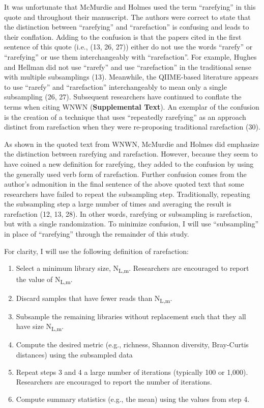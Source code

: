 \documentclass[
]{article}
\providecommand{\tightlist}{%
  \setlength{\itemsep}{0pt}\setlength{\parskip}{0pt}}
\begin{document}
It was unfortunate that McMurdie and Holmes used the term ``rarefying''
in this quote and throughout their manuscript. The authors were correct
to state that the distinction between ``rarefying'' and ``rarefaction''
is confusing and leads to their conflation. Adding to the confusion is
that the papers cited in the first sentence of this quote (i.e., (13,
26, 27)) either do not use the words ``rarefy'' or ``rarefying'' or use
them interchangeably with ``rarefaction''. For example, Hughes and
Hellman did not use ``rarefy'' and use ``rarefaction'' in the
traditional sense with multiple subsamplings (13). Meanwhile, the
QIIME-based literature appears to use ``rarefy'' and ``rarefaction''
interchangeably to mean only a single subsampling (26, 27). Subsequent
researchers have continued to conflate the terms when citing WNWN
(\textbf{Supplemental Text}). An exemplar of the confusion is the
creation of a technique that uses ``repeatedly rarefying'' as an
approach distinct from rarefaction when they were re-proposing
traditional rarefaction (30).

As shown in the quoted text from WNWN, McMurdie and Holmes did emphasize
the distinction between rarefying and rarefaction. However, because they
seem to have coined a new definition for rarefying, they added to the
confusion by using the generally used verb form of rarefaction. Further
confusion comes from the author's admonition in the final sentence of
the above quoted text that some researchers have failed to repeat the
subsampling step. Traditionally, repeating the subsampling step a large
number of times and averaging the result is rarefaction (12, 13, 28). In
other words, rarefying or subsampling is rarefaction, but with a single
randomization. To minimize confusion, I will use ``subsampling'' in
place of ``rarefying'' through the remainder of this study.

For clarity, I will use the following definition of rarefaction:

\begin{enumerate}
\def\labelenumi{\arabic{enumi}.}
\tightlist
\item
  Select a minimum library size, N\textsubscript{L,m}. Researchers are
  encouraged to report the value of N\textsubscript{L,m}.
\item
  Discard samples that have fewer reads than N\textsubscript{L,m}.
\item
  Subsample the remaining libraries without replacement such that they
  all have size N\textsubscript{L,m}.
\item
  Compute the desired metric (e.g., richness, Shannon diversity,
  Bray-Curtis distances) using the subsampled data
\item
  Repeat steps 3 and 4 a large number of iterations (typically 100 or
  1,000). Researchers are encouraged to report the number of iterations.
\item
  Compute summary statistics (e.g., the mean) using the values from step
  4.
\end{enumerate}
\end{document}
